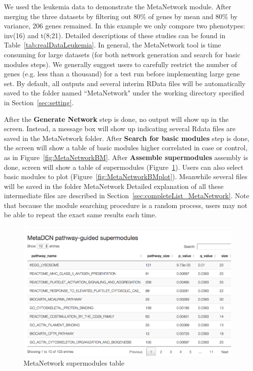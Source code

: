 We used the leukemia data to demonstrate the MetaNetwork module.
After merging the three datasets by filtering out 80\% of genes by mean and 80\% by variance, 206 genes remained.
In this example we only compare two phenotypes: inv(16) and t(8;21).
Detailed descriptions of these studies can be found in Table~\ref{tab:realDataLeukemia}. 
In general, the MetaNetwork tool is time consuming for large datasets (for both network generation and search for basic modules steps).
We generally suggest users to carefully restrict the number of genes (e.g. less than a thousand) for a test run before implementing large gene set.
By default, all outputs and several interim RData files will be automatically saved to the folder named ``MetaNetwork" under the working directory specified in Section~\ref{sec:setting}.




After the  \textbf{Generate Network} step is done, 
no output will show up in the screen. Instead, a message box will show up indicating several Rdata files are saved in the MetaNetwork folder. 
After \textbf{Search for basic modules} step is done, the screen will show a table of basic modules higher correlated in case or control, 
as in Figure~\ref{fig:MetaNetworkBM}. 
After \textbf{Assemble supermodules} assembly is done, screen will show a table of supermodules (Figure~\ref{fig:MetaNetworksuper}). 
Users can also select basic modules to plot (Figure~\ref{fig:MetaNetworkBMplot}). 
Meanwhile several files will be saved in the folder MetaNetwork
Detailed explanation of all these intermediate files are described in Section~\ref{sec:completeList_MetaNetwork}.
Note that because the module searching procedure is a random process, users may not be able to repeat the exact same results each time.

\begin{figure}[H]
\begin{center}
\includegraphics[scale=0.7]{./figure/MetaNetwork/MetaNetworksuper.png}
\caption{MetaNetwork supermodules table}
\label{fig:MetaNetworksuper}
\end{center}
\end{figure}

